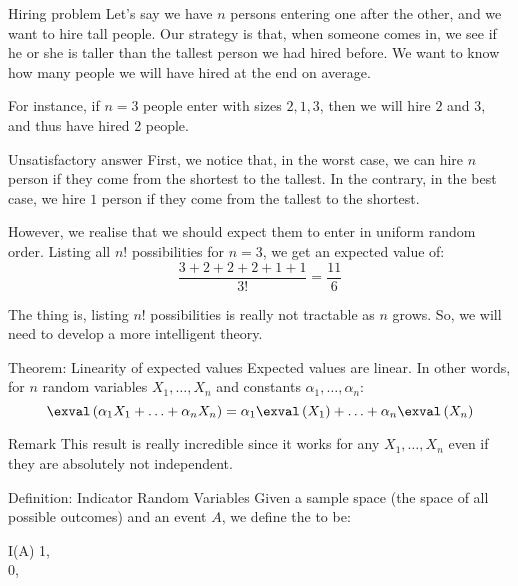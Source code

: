 \documentclass[a4paper]{article}
\begin{document}
\begin{parag}{Hiring problem}
    Let's say we have $n$ persons entering one after the other, and we want to hire tall people. Our strategy is that, when someone comes in, we see if he or she is taller than the tallest person we had hired before. We want to know how many people we will have hired at the end on average.

    For instance, if $n = 3$ people enter with sizes $2, 1, 3$, then we will hire $2$ and $3$, and thus have hired 2 people.

    \begin{subparag}{Unsatisfactory answer}
        First, we notice that, in the worst case, we can hire $n$ person if they come from the shortest to the tallest. In the contrary, in the best case, we hire $1$ person if they come from the tallest to the shortest.

        However, we realise that we should expect them to enter in uniform random order. Listing all $n!$ possibilities for $n = 3$, we get an expected value of: 
        \[\frac{3 + 2 + 2 + 2 + 1 + 1}{3!} = \frac{11}{6}\]
        
        The thing is, listing $n!$ possibilities is really not tractable as $n$ grows. So, we will need to develop a more intelligent theory.
    \end{subparag}
\end{parag}

\begin{parag}{Theorem: Linearity of expected values}
    Expected values are linear. In other words, for $n$ random variables $X_1, \ldots, X_n$ and constants $\alpha_1, \ldots, \alpha_n$:
    \[\exval\left(\alpha_1 X_1 + \ldots + \alpha_n X_n\right) = \alpha_1 \exval\left(X_1\right) + \ldots + \alpha_n\exval\left(X_n\right)\]
    
    \begin{subparag}{Remark}
        This result is really incredible since it works for any $X_1, \ldots, X_n$ even if they are absolutely not independent.
    \end{subparag}
\end{parag}

\begin{parag}{Definition: Indicator Random Variables}
    Given a sample space (the space of all possible outcomes) and an event $A$, we define the  to be:
    \begin{functionbypart}{I\left(A\right)}
    1, \mathspace {}  \\
    0, \mathspace {}
    \end{functionbypart}
\end{parag}
\end{document}
